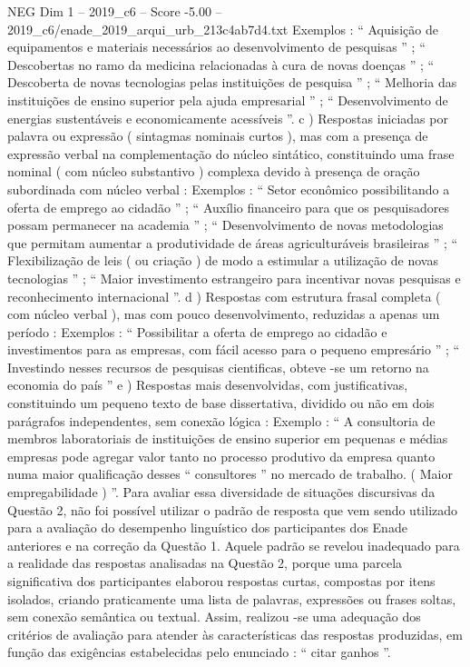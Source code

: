 \begin{textsample}{NEG Dim 1 – 2019\_c6 – Score -5.00 – 2019\_c6/enade\_2019\_arqui\_urb\_213c4ab7d4.txt}
Exemplos : “ Aquisição de equipamentos e materiais necessários ao desenvolvimento de pesquisas ” ; “ Descobertas no ramo da medicina relacionadas à cura de novas doenças ” ; “ Descoberta de novas tecnologias pelas instituições de pesquisa ” ; “ Melhoria das instituições de ensino superior pela ajuda empresarial ” ; “ Desenvolvimento de energias sustentáveis e economicamente acessíveis ”. c ) Respostas iniciadas por palavra ou expressão ( sintagmas nominais curtos ), mas com a presença de expressão verbal na complementação do núcleo sintático, constituindo uma frase nominal ( com núcleo substantivo ) complexa devido à presença de oração subordinada com núcleo verbal : Exemplos : “ Setor econômico possibilitando a oferta de emprego ao cidadão ” ; “ Auxílio financeiro para que os pesquisadores possam permanecer na academia ” ; “ Desenvolvimento de novas metodologias que permitam aumentar a produtividade de áreas agriculturáveis brasileiras ” ; “ Flexibilização de leis ( ou criação ) de modo a estimular a utilização de novas tecnologias ” ; “ Maior investimento estrangeiro para incentivar novas pesquisas e reconhecimento internacional ”. d ) Respostas com estrutura frasal completa ( com núcleo verbal ), mas com pouco desenvolvimento, reduzidas a apenas um período : Exemplos : “ Possibilitar a oferta de emprego ao cidadão e investimentos para as empresas, com fácil acesso para o pequeno empresário ” ; “ Investindo nesses recursos de pesquisas cientificas, obteve -se um retorno na economia do país ” e ) Respostas mais desenvolvidas, com justificativas, constituindo um pequeno texto de base dissertativa, dividido ou não em dois parágrafos independentes, sem conexão lógica : Exemplo : “ A consultoria de membros laboratoriais de instituições de ensino superior em pequenas e médias empresas pode agregar valor tanto no processo produtivo da empresa quanto numa maior qualificação desses “ consultores ” no mercado de trabalho. ( Maior empregabilidade ) ”.
Para avaliar essa diversidade de situações discursivas da Questão 2, não foi possível utilizar o padrão de resposta que vem sendo utilizado para a avaliação do desempenho linguístico dos participantes dos Enade anteriores e na correção da Questão 1.
Aquele padrão se revelou inadequado para a realidade das respostas analisadas na Questão 2, porque uma parcela significativa dos participantes elaborou respostas curtas, compostas por itens isolados, criando praticamente uma lista de palavras, expressões ou frases soltas, sem conexão semântica ou textual.
Assim, realizou -se uma adequação dos critérios de avaliação para atender às características das respostas produzidas, em função das exigências estabelecidas pelo enunciado : “ citar ganhos ”.

\end{textsample}
